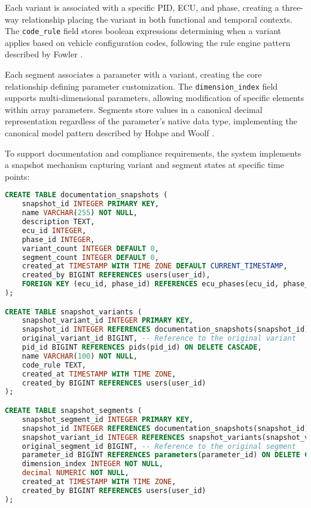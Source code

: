 Each variant is associated with a specific PID, ECU, and phase, creating a three-way relationship placing the variant in both functional and temporal contexts. The \texttt{code\_rule} field stores boolean expressions determining when a variant applies based on vehicle configuration codes, following the rule engine pattern described by Fowler \cite{fowler2003patterns}.

Each segment associates a parameter with a variant, creating the core relationship defining parameter customization. The \texttt{dimension\_index} field supports multi-dimensional parameters, allowing modification of specific elements within array parameters. Segments store values in a canonical decimal representation regardless of the parameter's native data type, implementing the canonical model pattern described by Hohpe and Woolf \cite{hohpe2002enterprise}.

To support documentation and compliance requirements, the system implements a snapshot mechanism capturing variant and segment states at specific time points:

\begin{lstlisting}[language=SQL, caption={Documentation Snapshot Implementation}, label={lst:documentation-snapshot}]
CREATE TABLE documentation_snapshots (
    snapshot_id INTEGER PRIMARY KEY,
    name VARCHAR(255) NOT NULL,
    description TEXT,
    ecu_id INTEGER,
    phase_id INTEGER,
    variant_count INTEGER DEFAULT 0,
    segment_count INTEGER DEFAULT 0,
    created_at TIMESTAMP WITH TIME ZONE DEFAULT CURRENT_TIMESTAMP,
    created_by BIGINT REFERENCES users(user_id),
    FOREIGN KEY (ecu_id, phase_id) REFERENCES ecu_phases(ecu_id, phase_id)
);

CREATE TABLE snapshot_variants (
    snapshot_variant_id INTEGER PRIMARY KEY,
    snapshot_id INTEGER REFERENCES documentation_snapshots(snapshot_id) ON DELETE CASCADE,
    original_variant_id BIGINT, -- Reference to the original variant
    pid_id BIGINT REFERENCES pids(pid_id) ON DELETE CASCADE,
    name VARCHAR(100) NOT NULL,
    code_rule TEXT,
    created_at TIMESTAMP WITH TIME ZONE,
    created_by BIGINT REFERENCES users(user_id)
);

CREATE TABLE snapshot_segments (
    snapshot_segment_id INTEGER PRIMARY KEY,
    snapshot_id INTEGER REFERENCES documentation_snapshots(snapshot_id) ON DELETE CASCADE,
    snapshot_variant_id INTEGER REFERENCES snapshot_variants(snapshot_variant_id) ON DELETE CASCADE,
    original_segment_id BIGINT, -- Reference to the original segment
    parameter_id BIGINT REFERENCES parameters(parameter_id) ON DELETE CASCADE,
    dimension_index INTEGER NOT NULL,
    decimal NUMERIC NOT NULL,
    created_at TIMESTAMP WITH TIME ZONE,
    created_by BIGINT REFERENCES users(user_id)
);
\end{lstlisting}

